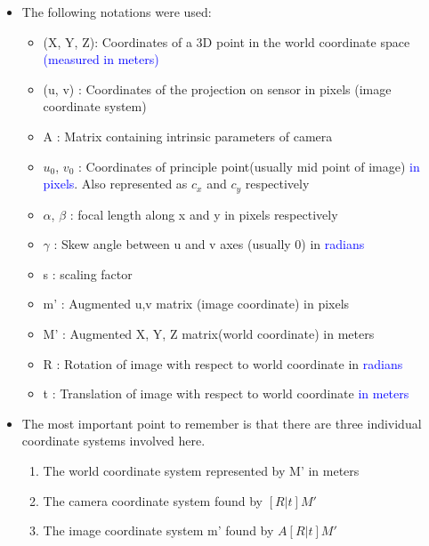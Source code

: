\begin{itemize}
                    
            \item        The following notations were used:
                            \begin{itemize}
                                \item (X, Y, Z): Coordinates of a 3D point in the world coordinate space \textcolor{blue}{(measured in meters)}
                                \item (u, v)   : Coordinates of the projection on sensor in pixels (image coordinate system)
                                \item A        : Matrix containing intrinsic parameters of camera
                                \item $u_0$, $v_0$  : Coordinates of principle point(usually mid point of image) \textcolor{blue}{in pixels}. Also represented as $c_x$ and $c_y$ respectively
                                \item $\alpha$, $\beta$ : focal length along x and y in pixels respectively
                                \item $\gamma$ : Skew angle between u and v axes (usually 0) in \textcolor{blue}{radians}
                                \item s : scaling factor
                                \item m' : Augmented u,v matrix (image coordinate) in pixels
                                \item M' : Augmented X, Y, Z matrix(world coordinate) in meters
                                \item R  : Rotation of image with respect to world coordinate in \textcolor{blue}{radians}
                                \item t  : Translation of image with respect to world coordinate \textcolor{blue}{in meters}
                                
                            \end{itemize}
                            
            \item The most important point to remember is that there are three individual coordinate systems involved here.  
            
                \begin{enumerate}
                    \item The world coordinate system represented by M' in meters
                    \item The camera coordinate system found by $[R|t]M'$
                    \item The image coordinate system m' found by $A[R|t]M'$
                \end{enumerate}
                

\end{itemize}
